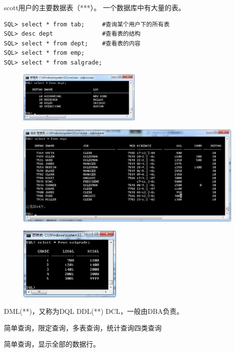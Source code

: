 \documentclass[a4paper,12pt]{ctexart}
\begin{document}
scott用户的主要数据表（***）。  一个数据库中有大量的表。
\begin{verbatim}
SQL> select * from tab;     #查询某个用户下的所有表
SQL> desc dept              #查看表的结构
SQL> select * from dept;    #查看表的内容
SQL> select * from emp;
SQL> select * from salgrade;
\end{verbatim}
\begin{figure}[H]
  \centering
  \includegraphics[width=6cm]{oracle/table_dept.png}
\end{figure}
\begin{figure}[H]
  \centering
  \includegraphics[width=14cm]{oracle/table_emp.png}
\end{figure}
\begin{figure}[H]
  \centering
  \includegraphics[width=5cm]{oracle/table_salgrade.png}
\end{figure}

DML(**)，又称为DQL
DDL(**)
DCL，一般由DBA负责。

简单查询，限定查询，多表查询，统计查询四类查询

简单查询，显示全部的数据行。



%


%
%

%
\end{document}
